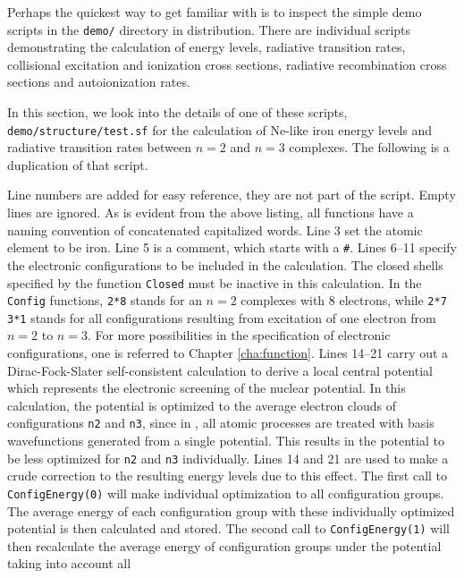 Perhaps the quickest way to get familiar with \cFAC is to inspect the simple
demo scripts in the \verb|demo/| directory in \cFAC distribution. There
are individual scripts demonstrating the
calculation of energy levels, radiative transition rates, collisional
excitation and ionization cross sections, radiative recombination cross
sections and autoionization rates.

In this section, we look into the details of one of these scripts,
\verb|demo/structure/test.sf| for the calculation of Ne-like iron
energy levels and radiative transition rates between $n = 2$ and $n = 3$
complexes. The following is a duplication of that script.

\lstset{numbers=left,caption=demo/structure/test.sf}

Line numbers are added for easy reference, they are not part of the script. 
Empty lines are ignored. As is evident from the above listing, all functions
have a naming convention of concatenated capitalized words.
Line 3 set the atomic element to be iron. Line 5 is a comment, which starts
with a \verb|#|. Lines 6--11 specify the electronic configurations to be
included in the calculation. The closed shells specified by the function
\verb|Closed| must be inactive in this calculation. In the \verb|Config|
functions, \verb|2*8| stands for an $n = 2$ complexes with 8 electrons, while
\verb|2*7 3*1| stands for all configurations resulting from excitation of one
electron from $n = 2$ to $n = 3$. For more possibilities in the specification
of electronic configurations, one is referred to Chapter \ref{cha:function}.
Lines 14--21 carry out a Dirac-Fock-Slater self-consistent calculation to
derive a local central potential which represents the electronic screening of
the nuclear potential. In this calculation, the potential is optimized to the
average electron clouds of configurations \verb|n2| and \verb|n3|, since in
\cFAC, all atomic processes are treated with basis wavefunctions generated from
a single potential. This
results in the potential to be less optimized for \verb|n2| and \verb|n3|
individually. Lines 14 and 21 are used to make a crude correction to the
resulting energy levels due to this effect. The first call to
\verb|ConfigEnergy(0)| will make individual optimization to all configuration
groups. The average energy of each configuration group with these individually 
optimized potential is then calculated and stored. The
second call to \verb|ConfigEnergy(1)| will then recalculate the average energy
of configuration groups under the potential taking into account all
